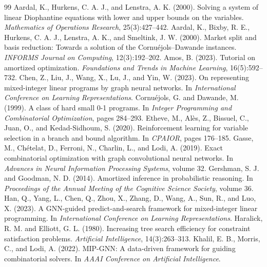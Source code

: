\documentclass[final,5p,times,twocolumn]{elsarticle}
\begin{document}
\begin{thebibliography}{99}
 Aardal, K., Hurkens, C. A. J., and Lenstra, A. K. (2000). Solving a system of linear Diophantine equations with lower and upper bounds on the variables. \emph{Mathematics of Operations Research}, 25(3):427--442.
 Aardal, K., Bixby, R. E., Hurkens, C. A. J., Lenstra, A. K., and Smeltink, J. W. (2000). Market split and basis reduction: Towards a solution of the Cornu\'ejols--Dawande instances. \emph{INFORMS Journal on Computing}, 12(3):192--202.
 Amos, B. (2023). Tutorial on amortized optimization. \emph{Foundations and Trends in Machine Learning}, 16(5):592--732.
 Chen, Z., Liu, J., Wang, X., Lu, J., and Yin, W. (2023). On representing mixed-integer linear programs by graph neural networks. In \emph{International Conference on Learning Representations}.
 Cornu\'ejols, G. and Dawande, M. (1999). A class of hard small 0-1 programs. In \emph{Integer Programming and Combinatorial Optimization}, pages 284--293.
 Etheve, M., Al\`es, Z., Bissuel, C., Juan, O., and Kedad-Sidhoum, S. (2020). Reinforcement learning for variable selection in a branch and bound algorithm. In \emph{CPAIOR}, pages 176--185.
 Gasse, M., Ch\'etelat, D., Ferroni, N., Charlin, L., and Lodi, A. (2019). Exact combinatorial optimization with graph convolutional neural networks. In \emph{Advances in Neural Information Processing Systems}, volume 32.
 Gershman, S. J. and Goodman, N. D. (2014). Amortized inference in probabilistic reasoning. In \emph{Proceedings of the Annual Meeting of the Cognitive Science Society}, volume 36.
 Han, Q., Yang, L., Chen, Q., Zhou, X., Zhang, D., Wang, A., Sun, R., and Luo, X. (2023). A GNN-guided predict-and-search framework for mixed-integer linear programming. In \emph{International Conference on Learning Representations}.
 Haralick, R. M. and Elliott, G. L. (1980). Increasing tree search efficiency for constraint satisfaction problems. \emph{Artificial Intelligence}, 14(3):263--313.
 Khalil, E. B., Morris, C., and Lodi, A. (2022). MIP-GNN: A data-driven framework for guiding combinatorial solvers. In \emph{AAAI Conference on Artificial Intelligence}.

\end{thebibliography}
\end{document}
